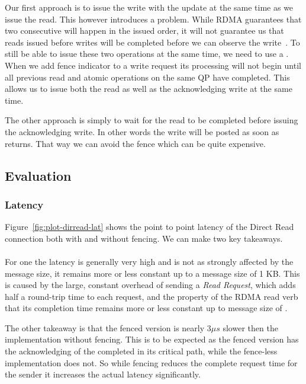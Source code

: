 Our first approach is to issue the write with the update at the same time as we issue the read. This however introduces a 
problem. While RDMA guarantees that two consecutive will happen in the issued order, it will not guarantee us that reads issued
before writes will be completed before we can observe the write~\cite{}.  To still be able to issue these two operations at the same time, we need to use a . When we add 
fence indicator to a write request its processing will not begin until all previous read and atomic operations on the same QP 
have completed. This allows us to issue both the read as well as the acknowledging write at the same time.

The other approach is simply to wait for the read to be completed before issuing the acknowledging write. In other words the
write will be posted as soon as  returns. That way we can avoid the fence which can be quite expensive.

\subsection{Evaluation}

\subsubsection{Latency}

Figure~\ref{fig:plot-dirread-lat} shows the point to point latency of the Direct Read connection both with and without
fencing. We can make two key takeaways.

\paragraph{}For one the latency is generally very high and is not as strongly affected by the message size, it remains more or
less constant up to a message size of 1 KB. This is caused by the large, constant overhead of sending a \emph{Read Request},
which adds half a round-trip time to each request, and the property of the RDMA read verb that its completion time remains 
more or less constant up to message size of .

The other takeaway is that the fenced version is nearly $3 \mu s$ slower then the implementation without fencing. This is to 
be expected as the fenced version has the acknowledging of the completed in its critical path, while the fence-less 
implementation does not. So while fencing reduces the complete request time for the sender
it increases the actual latency significantly.


